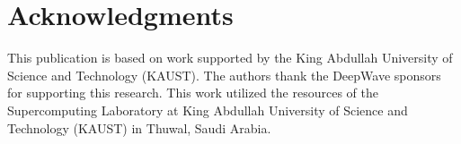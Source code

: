 \section*{Acknowledgments}
This publication is based on work supported by the King Abdullah University of Science and Technology (KAUST). The authors thank the DeepWave sponsors for supporting this research. This work utilized the resources of the Supercomputing Laboratory at King Abdullah University of Science and Technology (KAUST) in Thuwal, Saudi Arabia.